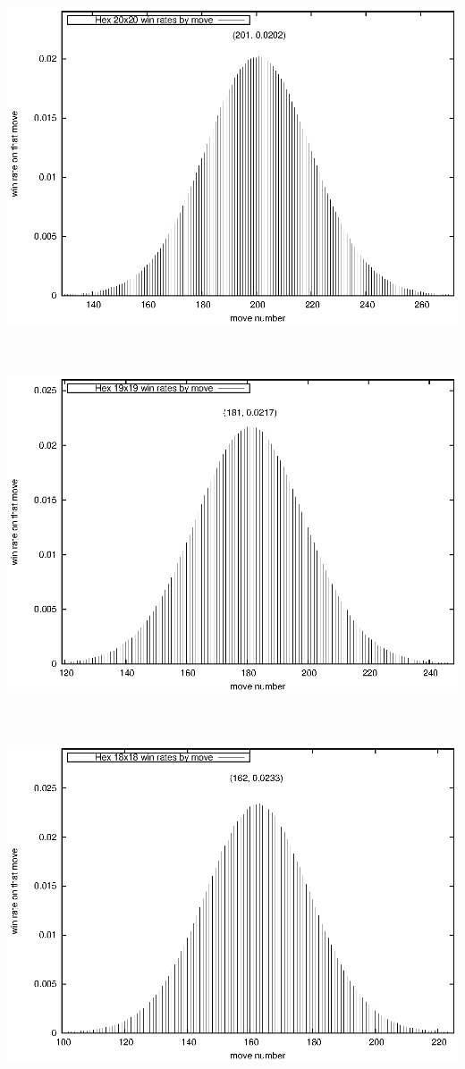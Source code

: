 \documentclass[12pt]{article}
\begin{document}
\ \hfill \includegraphics{code/data/gn/winrate.20.eps} \hfill \ 

\ \hfill \includegraphics{code/data/gn/winrate.19.eps} \hfill \ 

\ \hfill \includegraphics{code/data/gn/winrate.18.eps} \hfill \ 
\end{document}
